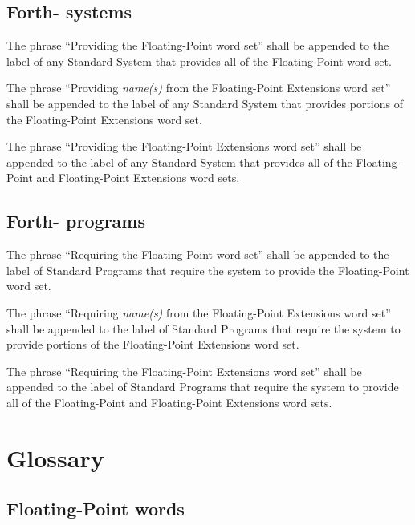 \cbstart{}
\subsection[Forth-\snapshot systems]{Forth-\snapshot{} systems} %
\cbend

The phrase ``Providing the Floating-Point word set'' shall be
appended to the label of any Standard System that provides all of
the Floating-Point word set.

The phrase ``Providing \emph{name(s)} from the Floating-Point
Extensions word set'' shall be appended to the label of any Standard
System that provides portions of the Floating-Point Extensions word
set.

The phrase ``Providing the Floating-Point Extensions word set'' shall
be appended to the label of any Standard System that provides all of
the Floating-Point and Floating-Point Extensions word sets.

\cbstart{}
\subsection[Forth-\snapshot programs]{Forth-\snapshot{} programs} %
\cbend

The phrase ``Requiring the Floating-Point word set'' shall be
appended to the label of Standard Programs that require the system
to provide the Floating-Point word set.

The phrase ``Requiring \emph{name(s)} from the Floating-Point
Extensions word set'' shall be appended to the label of Standard
Programs that require the system to provide portions of the
Floating-Point Extensions word set.

The phrase ``Requiring the Floating-Point Extensions word set'' shall
be appended to the label of Standard Programs that require the system
to provide all of the Floating-Point and Floating-Point Extensions
word sets.


\section{Glossary} %

\subsection{Floating-Point words} %


